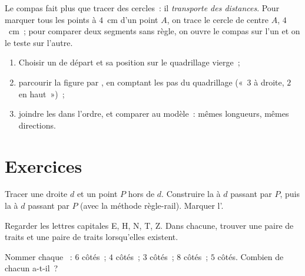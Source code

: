 \begin{example}\label{ex:g4:geometry:compass}
Le compas fait plus que tracer des cercles~: il \emph{transporte
des distances}. Pour marquer tous les points à $4$~cm d'un point
$A$, on trace le cercle de centre $A$,  $4$~cm~; pour comparer
deux segments sans règle, on ouvre le compas sur l'un et on le
teste sur l'autre.
\end{example}

\begin{method}\label{met:g4:geometry:reproduce}
\begin{enumerate}
  \item Choisir un  de départ et sa position sur le
        quadrillage vierge~;
  \item parcourir la figure  par , en comptant les pas
        du quadrillage («~$3$ à droite, $2$ en haut~»)~;
  \item joindre les  dans l'ordre, et comparer au modèle~:
        mêmes longueurs, mêmes directions.
\end{enumerate}
\end{method}

\section{Exercices}

\begin{exercise}[$\star$]\label{exo:g4:geometry:1}
Tracer une droite $d$ et un point $P$ hors de $d$. Construire la
 à $d$ passant par $P$, puis la  à $d$
passant par $P$ (avec la méthode règle-rail). Marquer l'.
\end{exercise}

\begin{exercise}[$\star$]\label{exo:g4:geometry:2}
Regarder les lettres capitales E, H, N, T, Z. Dans chacune, trouver
une paire de traits  et une paire de traits
 lorsqu'elles existent.
\end{exercise}

\begin{exercise}[$\star$]\label{exo:g4:geometry:3}
Nommer chaque ~: $6$ côtés~; $4$ côtés~; $3$ côtés~;
$8$ côtés~; $5$ côtés. Combien de \emph{} chacun a-t-il~?
\end{exercise}

